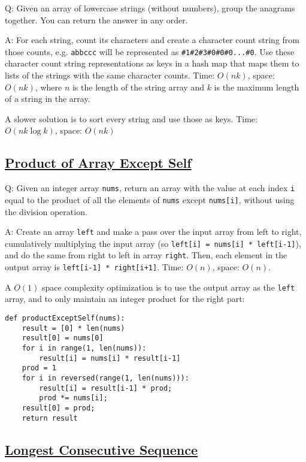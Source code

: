 \documentclass[8pt, table, xcdraw]{article}%
\begin{document}
Q: Given an array of lowercase strings (without numbers), group the anagrams together. You can return the answer in any order.

A: For each string, count its characters and create a character count string from those counts, e.g. \lstinline{abbccc} will be represented as \lstinline{#1#2#3#0#0#0...#0}. Use these character count string representations as keys in a hash map that maps them to lists of the strings with the same character counts. Time: $O(nk)$, space: $O(nk)$, where $n$ is the length of the string array and $k$ is the maximum length of a string in the array.

A slower solution is to sort every string and use those as keys. Time: $O(nk\log k)$, space: $O(nk)$

\subsection{\href{https://leetcode.com/problems/product-of-array-except-self}{Product of Array Except Self}}

Q: Given an integer array \lstinline{nums}, return an array with the value at each index \lstinline{i} equal to the product of all the elements of \lstinline{nums} except \lstinline{nums[i]}, without using the division operation.

A: Create an array \lstinline{left} and make a pass over the input array from left to right, cumulatively multiplying the input array (so \lstinline{left[i] = nums[i] * left[i-1]}), and do the same from right to left in array \lstinline{right}. Then, each element in the output array is \lstinline{left[i-1] * right[i+1]}. Time: $O(n)$, space: $O(n)$.

A $O(1)$ space complexity optimization is to use the output array as the \lstinline{left} array, and to only maintain an integer product for the right part:

\begin{lstlisting}
def productExceptSelf(nums):
    result = [0] * len(nums)
    result[0] = nums[0]
    for i in range(1, len(nums)):
        result[i] = nums[i] * result[i-1]
    prod = 1
    for i in reversed(range(1, len(nums))):
        result[i] = result[i-1] * prod;
        prod *= nums[i];
    result[0] = prod;
    return result
\end{lstlisting}

\subsection{\href{https://leetcode.com/problems/longest-consecutive-sequence}{Longest Consecutive Sequence}}
\end{document}
